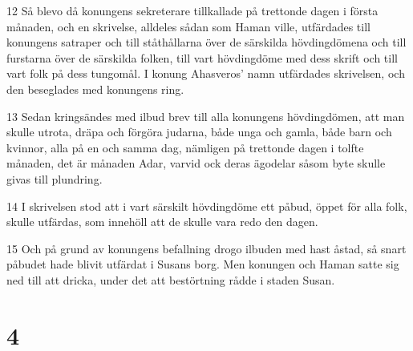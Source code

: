 \par 12 Så blevo då konungens sekreterare tillkallade på trettonde dagen i första månaden, och en skrivelse, alldeles sådan som Haman ville, utfärdades till konungens satraper och till ståthållarna över de särskilda hövdingdömena och till furstarna över de särskilda folken, till vart hövdingdöme med dess skrift och till vart folk på dess tungomål. I konung Ahasveros' namn utfärdades skrivelsen, och den beseglades med konungens ring.
\par 13 Sedan kringsändes med ilbud brev till alla konungens hövdingdömen, att man skulle utrota, dräpa och förgöra judarna, både unga och gamla, både barn och kvinnor, alla på en och samma dag, nämligen på trettonde dagen i tolfte månaden, det är månaden Adar, varvid ock deras ägodelar såsom byte skulle givas till plundring.
\par 14 I skrivelsen stod att i vart särskilt hövdingdöme ett påbud, öppet för alla folk, skulle utfärdas, som innehöll att de skulle vara redo den dagen.
\par 15 Och på grund av konungens befallning drogo ilbuden med hast åstad, så snart påbudet hade blivit utfärdat i Susans borg. Men konungen och Haman satte sig ned till att dricka, under det att bestörtning rådde i staden Susan.

\chapter{4}

